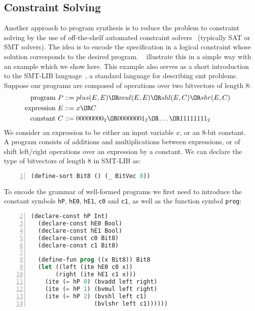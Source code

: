 \subsection{Constraint Solving}
\label{sec:constraint-solving}

Another approach to program synthesis is to reduce the problem to
constraint solving by the use of off-the-shelf automated constraint
solvers~\cite{Shi:2019:FCS,Feng:2018:PSU,Feng:2017:CST,Feng:2017:CSC,Solar-Lezama:2008,Jha:oracle:2010}
(typically SAT or SMT solvers).
The idea is to encode the specification in a logical constraint whose solution
corresponds to the desired program.
\citeauthor{Gulwani2017}~\cite{Gulwani2017} illustrate this in a simple way with
an example which we show here.
This example also serves as a short introduction to the SMT-LIB
language~\cite{BarFT-RR-17}, a standard language for describing \gls{smt}
problems.
Suppose our programs are composed of operations over two bitvectors of length 8:
%
\begin{align*}
  \text{program }P    &::= plus(E,E) \OR mul(E,E) \OR shl(E,C) \OR shr(E,C)    \\
  \text{expression }E &::= x \OR C                                             \\
  \text{constant }C   &::= 00000000_2 \OR 00000001_2 \OR \ldots \OR 11111111_2 \\
\end{align*}
%
\noindent
We consider an expression to be either an input variable $x$, or an 8-bit
constant.
A program consists of additions and multiplications between expressions, or of
shift left/right operations over an expression by a constant.
We can declare the type of bitvectors of length 8 in SMT-LIB as:
%
\begin{lstlisting}[language=Lisp,numbers=left,
  firstnumber=1,
  morekeywords={define-sort},
  xleftmargin=.2\textwidth, xrightmargin=.2\textwidth]
  (define-sort Bit8 () (_ BitVec 8))
\end{lstlisting}
%
\noindent
To encode the grammar of well-formed programs we first need to introduce the
constant symbols \texttt{hP}, \texttt{hE0}, \texttt{hE1}, \texttt{c0} and
\texttt{c1}, as well as the function symbol \texttt{prog}:
%
\begin{lstlisting}[language=Lisp,
  numbers=left,
  firstnumber=2,
  morekeywords={declare-const,define-fun,ite},
  xleftmargin=.2\textwidth, xrightmargin=.2\textwidth]
  (declare-const hP Int)
  (declare-const hE0 Bool)
  (declare-const hE1 Bool)
  (declare-const c0 Bit8)
  (declare-const c1 Bit8)

  (define-fun prog ((x Bit8)) Bit8
  (let ((left (ite hE0 c0 x))
       (right (ite hE1 c1 x)))
    (ite (= hP 0) (bvadd left right)
    (ite (= hP 1) (bvmul left right)
    (ite (= hP 2) (bvshl left c1)
                  (bvlshr left c1))))))
\end{lstlisting}
